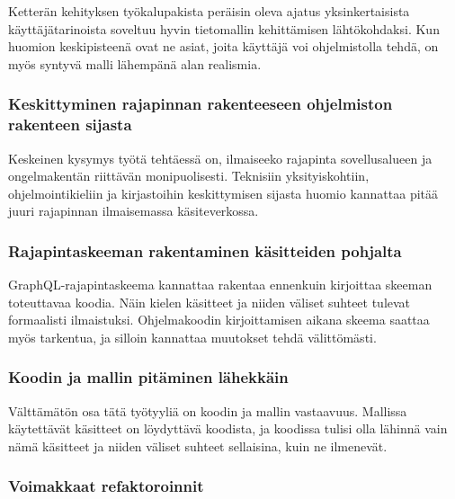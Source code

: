 Ketterän kehityksen työkalupakista peräisin oleva ajatus
yksinkertaisista käyttäjätarinoista soveltuu hyvin tietomallin
kehittämisen lähtökohdaksi. Kun huomion keskipisteenä ovat ne asiat,
joita käyttäjä voi ohjelmistolla tehdä, on myös syntyvä malli lähempänä
alan realismia.

\hypertarget{keskittyminen-rajapinnan-rakenteeseen-ohjelmiston-rakenteen-sijasta}{%
\subsubsection{Keskittyminen rajapinnan rakenteeseen ohjelmiston
rakenteen
sijasta}\label{keskittyminen-rajapinnan-rakenteeseen-ohjelmiston-rakenteen-sijasta}}

Keskeinen kysymys työtä tehtäessä on, ilmaiseeko rajapinta
sovellusalueen ja ongelmakentän riittävän monipuolisesti. Teknisiin
yksityiskohtiin, ohjelmointikieliin ja kirjastoihin keskittymisen
sijasta huomio kannattaa pitää juuri rajapinnan ilmaisemassa
käsiteverkossa.

\hypertarget{rajapintaskeeman-rakentaminen-kuxe4sitteiden-pohjalta}{%
\subsubsection{Rajapintaskeeman rakentaminen käsitteiden
pohjalta}\label{rajapintaskeeman-rakentaminen-kuxe4sitteiden-pohjalta}}

GraphQL-rajapintaskeema kannattaa rakentaa ennenkuin kirjoittaa skeeman
toteuttavaa koodia. Näin kielen käsitteet ja niiden väliset suhteet
tulevat formaalisti ilmaistuksi. Ohjelmakoodin kirjoittamisen aikana
skeema saattaa myös tarkentua, ja silloin kannattaa muutokset tehdä
välittömästi.

\hypertarget{koodin-ja-mallin-pituxe4minen-luxe4hekkuxe4in}{%
\subsubsection{Koodin ja mallin pitäminen
lähekkäin}\label{koodin-ja-mallin-pituxe4minen-luxe4hekkuxe4in}}

Välttämätön osa tätä työtyyliä on koodin ja mallin vastaavuus. Mallissa
käytettävät käsitteet on löydyttävä koodista, ja koodissa tulisi olla
lähinnä vain nämä käsitteet ja niiden väliset suhteet sellaisina, kuin
ne  ilmenevät.

\hypertarget{voimakkaat-refaktoroinnit}{%
\subsubsection{Voimakkaat
refaktoroinnit}\label{voimakkaat-refaktoroinnit}}


